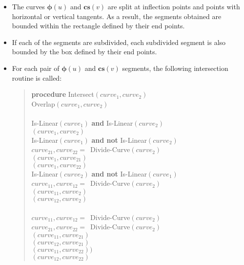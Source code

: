 \documentclass[10pt]{article}
\newcommand{\ve}[1]{\bm{#1}}
\begin{document}
\begin{itemize}
  \item The curves $\ve{\phi}(u)$ and $\ve{cs}(v)$ are split at inflection points and points with horizontal or vertical tangents. As a result, the segments obtained are bounded within the rectangle defined by their end points.
  
  \item If each of the segments are subdivided, each subdivided segment is also bounded by the box defined by their end points.
  
  \item For each pair of $\ve{\phi}(u)$ and $\ve{cs}(v)$ segments, the following intersection routine is called:
  
  \begin{verse}
    {\bf procedure} {\sc Intersect}$(curve_1, curve_2)$\\
     {\sc Overlap}$(curve_1, curve_2)$\\
    \quad {}\\
     {\sc Is-Linear}$(curve_1)$ {\bf and} {\sc Is-Linear}$(curve_2)$\\
    \quad {}$(curve_1, curve_2)$\\
     {\sc Is-Linear}$(curve_1)$ {\bf and not} {\sc Is-Linear}$(curve_2)$\\
    \quad \quad $curve_{21}, curve_{22} = $\ {\sc Divide-Curve}$(curve_2)$\\
    \quad {}$(curve_1, curve_{21})$\\
    \quad {}$(curve_1, curve_{22})$\\
     {\sc Is-Linear}$(curve_2)$ {\bf and not} {\sc Is-Linear}$(curve_1)$\\
    \quad \quad $curve_{11}, curve_{12} = $\ {\sc Divide-Curve}$(curve_2)$\\
    \quad {}$(curve_{11}, curve_2)$\\
    \quad {}$(curve_{12}, curve_2)$\\
    \\
    \quad \quad $curve_{11}, curve_{12} = $\ {\sc Divide-Curve}$(curve_2)$\\
    \quad \quad $curve_{21}, curve_{22} = $\ {\sc Divide-Curve}$(curve_2)$\\
    \quad {}$(curve_{11}, curve_{21})$\\
    \quad {}$(curve_{12}, curve_{21})$\\
    \quad {}$(curve_{11}, curve_{22}))$\\
    \quad {}$(curve_{12}, curve_{22})$\\
  \end{verse}
  

\end{itemize}
\end{document}
